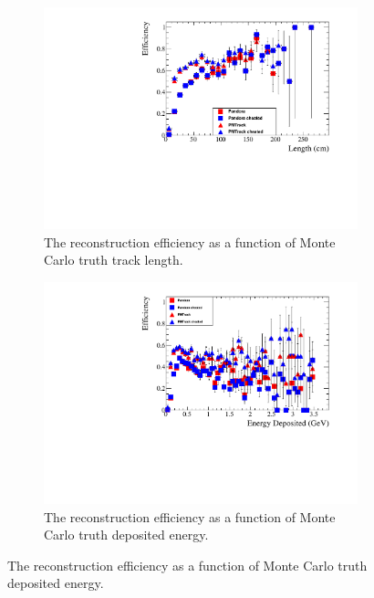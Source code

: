 \begin{figure}[h!]
  \centering
  \begin{subfigure}{.45\textwidth}
        \centering
        \includegraphics[width=\textwidth]{Effic_ProtonEnrich_500V_Proton_Length}
        \caption{The reconstruction efficiency as a function of Monte Carlo truth track length.}
        \label{fig:Prot_Effic_Len}
  \end{subfigure}
  \hspace{0.08\textwidth}
  \begin{subfigure}{.45\textwidth}
        \centering
        \includegraphics[width=\textwidth]{Effic_ProtonEnrich_500V_Proton_EnDepos}
        \caption{The reconstruction efficiency as a function of Monte Carlo truth deposited energy.}
        \label{fig:Prot_Effic_EnDepos}
  \end{subfigure}

\end{figure}

